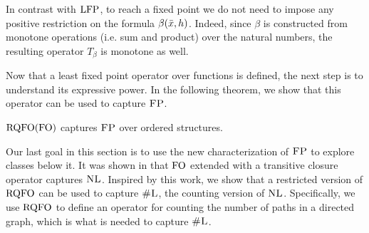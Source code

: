%
%
In contrast with ${\rm LFP}$, to reach a fixed point 
we do not need to impose any positive restriction on the formula $\beta(\bar{x},h)$.
Indeed, since $\beta$ is constructed from monotone operations (i.e. sum and product) over the natural numbers, the resulting operator $T_{\beta}$ is monotone as well.

Now that a least fixed point operator over functions is defined, the next step is to understand its expressive power.
In the following theorem, we show that this operator can be used to capture $\text{\sc FP}$.
\begin{theorem} \label{rqfo-fo-cap}
	${\rm RQFO}({\rm FO})$ captures $\text{\sc FP}$ over 
	ordered structures.
\end{theorem}

%
%
%

Our last goal in this section is to use the new characterization of $\text{\sc FP}$ to explore classes below it.
It was shown in \cite{I86,I88} that ${\rm FO}$ extended with a transitive closure operator captures $\text{\sc NL}$. 
Inspired by this work, we show that a restricted version of ${\rm RQFO}$ can be used to capture $\text{\sc \#L}$, the counting version of $\text{\sc NL}$. 
Specifically, we use ${\rm RQFO}$ to define an operator for counting the number of paths in a directed graph, which is what is needed to capture $\text{\sc \#L}$. 

